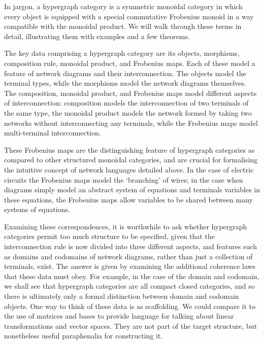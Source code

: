 In jargon, a hypergraph category is a symmetric monoidal category in
which every object is equipped with a special commutative Frobenius monoid in a
way compatible with the monoidal product. We will walk through these terms in
detail, illustrating them with examples and a few theorems. 

The key data comprising a hypergraph category are its objects, morphisms,
composition rule, monoidal product, and Frobenius maps. Each of these model a
feature of network diagrams and their interconnection. The objects model the
terminal types, while the morphisms model the network diagrams themselves. The
composition, monoidal product, and Frobenius maps model different aspects of
interconnection: composition models the interconnection of two terminals of the
same type, the monoidal product models the network formed by taking two networks
without interconnecting any terminals, while the Frobenius maps model
multi-terminal interconnection.

These Frobenius maps are the distinguishing feature of hypergraph categories as
compared to other structured monoidal categories, and are crucial for
formalising the intuitive concept of network languages detailed above. In the
case of electric circuits the Frobenius maps model the `branching' of wires; in
the case when diagrams simply model an abstract system of equations and
terminals variables in these equations, the Frobenius maps allow variables to be
shared between many systems of equations.

Examining these correspondences, it is worthwhile to ask whether hypergraph
categories permit too much structure to be specified, given that the
interconnection rule is now divided into three different aspects, and features
such as domains and codomains of network diagrams, rather than just a collection
of terminals, exist. The answer is given by examining the additional coherence
laws that these data must obey. For example, in the case of the domain and
codomain, we shall see that hypergraph categories are all compact closed
categories, and so there is ultimately only a formal distinction between domain
and codomain objects. One way to think of these data is as scaffolding. We could
compare it to the use of matrices and bases to provide language for talking
about linear transformations and vector spaces.  They are not part of the target
structure, but nonetheless useful paraphenalia for constructing it.

